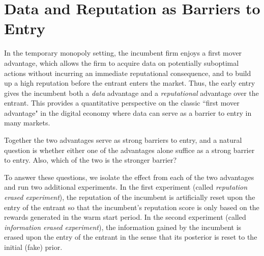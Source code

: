 \documentclass[../competing_bandits.tex]{subfiles}
\begin{document}
\section{Data and Reputation as Barriers to Entry}\label{section:6}
In the temporary monopoly setting, the incumbent firm enjoys a first
mover advantage, which allows the firm to acquire data on potentially
suboptimal actions without incurring an immediate reputational
consequence, and to build up a high reputation before the entrant
enters the market. Thus, the early entry gives the incumbent both a
\textit{data} advantage and a \textit{reputational} advantage over the
entrant. This provides a quantitative perspective on the classic
``first mover advantage" \cite{kerin1992first} in the digital economy
where data can serve as a barrier to entry in many markets.

Together the two advantages serve as strong barriers to entry, and a
natural question is whether either one of the advantages alone suffice
as a strong barrier to entry. Also, which of the two is the stronger
barrier?

{To answer these questions, we isolate the effect from each of the two
  advantages and run two additional experiments. In the first
  experiment (called \emph{reputation erased experiment}), the
  reputation of the incumbent is artificially reset upon the entry of
  the entrant {so that the incumbent's reputation score is only based
    on the rewards generated in the warm start period}. In the second
  experiment (called \emph{information erased experiment}), the
  information gained by the incumbent is erased upon the entry of the
  entrant in the sense that its posterior is reset to the initial
  (fake) prior.}
\end{document}

